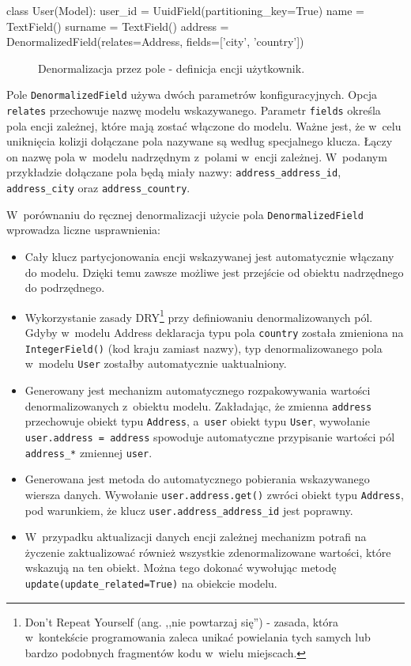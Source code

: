 \begin{verbbox}[\footnotesize]
class User(Model):
    user_id = UuidField(partitioning_key=True)
    name = TextField()
    surname = TextField()
    address = DenormalizedField(relates=Address, 
                                fields=['city', 'country'])
\end{verbbox}

\begin{figure}[ht!]
	\centering
	\theverbbox
	\caption{Denormalizacja przez pole - definicja encji użytkownik.}
	\label{lst:denormalization_by_field_example}
\end{figure}

Pole \verb+DenormalizedField+ używa dwóch parametrów konfiguracyjnych. Opcja \verb+relates+ przechowuje nazwę modelu wskazywanego. Parametr \verb+fields+ określa pola encji zależnej, które mają zostać włączone do modelu. Ważne jest, że w~celu uniknięcia kolizji dołączane pola nazywane są według specjalnego klucza. Łączy on nazwę pola w~modelu nadrzędnym z~polami w~encji zależnej. W~podanym przykładzie dołączane pola będą miały nazwy: \verb+address_address_id+, \verb+address_city+ oraz \verb+address_country+.

W~porównaniu do ręcznej denormalizacji użycie pola \verb+DenormalizedField+ wprowadza liczne usprawnienia:

\begin{itemize}
	\item Cały klucz partycjonowania encji wskazywanej jest automatycznie włączany do modelu. Dzięki temu zawsze możliwe jest przejście od obiektu nadrzędnego do podrzędnego.
	\item Wykorzystanie zasady DRY\footnote{Don't Repeat Yourself (ang. ,,nie powtarzaj się'') - zasada, która w~kontekście programowania zaleca unikać powielania tych samych lub bardzo podobnych fragmentów kodu w~wielu miejscach.} przy definiowaniu denormalizowanych pól. Gdyby w~modelu Address deklaracja typu pola \verb+country+ została zmieniona na \verb+IntegerField()+ (kod kraju zamiast nazwy), typ denormalizowanego pola w~modelu \verb+User+ zostałby automatycznie uaktualniony.
	\item Generowany jest mechanizm automatycznego rozpakowywania wartości denormalizowanych z~obiektu modelu. Zakładając, że zmienna \verb+address+ przechowuje obiekt typu \verb+Address+, a~\verb+user+ obiekt typu \verb+User+, wywołanie \verb+user.address = address+ spowoduje automatyczne przypisanie wartości pól \verb+address_*+ zmiennej \verb+user+.
	\item Generowana jest metoda do automatycznego pobierania wskazywanego wiersza danych. Wywołanie \verb+user.address.get()+ zwróci obiekt typu \verb+Address+, pod warunkiem, że klucz \verb+user.address_address_id+ jest poprawny.
	\item W~przypadku aktualizacji danych encji zależnej mechanizm potrafi na życzenie zaktualizować również wszystkie zdenormalizowane wartości, które wskazują na ten obiekt. Można tego dokonać wywołując metodę \verb+update(update_related=True)+ na obiekcie modelu.
\end{itemize}

